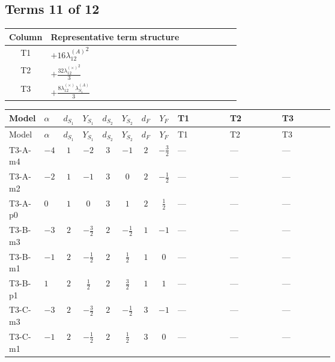 \documentclass[8pt]{article}
\begin{document}
\begin{landscape}
\subsection*{Terms 11 of 12}
\begin{center}
\begin{tabular}{@{}c >{\raggedright\arraybackslash}p{0.82\linewidth}@{}}
\toprule
Column & Representative term structure \\
\midrule
T1 & \(\displaystyle +16 {\lambda_{12}^{(A)}}^2\) \\
\midrule
T2 & \(\displaystyle +\frac{32 {\lambda_{12}^{(\times)}}^2}{3}\) \\
\midrule
T3 & \(\displaystyle +\frac{8 {\lambda_{12}^{(\times)}} {\lambda_{S_1}^{(A)}}}{3}\) \\
\midrule
\bottomrule
\end{tabular}
\end{center}
\smallskip
\tiny
\begin{longtable}{@{}llcccccc >{\raggedright\arraybackslash}p{0.21\linewidth} >{\raggedright\arraybackslash}p{0.21\linewidth} >{\raggedright\arraybackslash}p{0.21\linewidth}@{}}
\toprule
Model & $\alpha$ & $d_{S_1}$ & $Y_{S_1}$ & $d_{S_2}$ & $Y_{S_2}$ & $d_F$ & $Y_F$ & T1 & T2 & T3 \\
\midrule
\endfirsthead
\toprule
Model & $\alpha$ & $d_{S_1}$ & $Y_{S_1}$ & $d_{S_2}$ & $Y_{S_2}$ & $d_F$ & $Y_F$ & T1 & T2 & T3 \\
\midrule
\endhead
T3-A-m4 & $-4$ & $1$ & $-2$ & $3$ & $-1$ & $2$ & $-\frac{3}{2}$ & --- & --- & --- \\
\midrule
T3-A-m2 & $-2$ & $1$ & $-1$ & $3$ & $0$ & $2$ & $-\frac{1}{2}$ & --- & --- & --- \\
\midrule
T3-A-p0 & $0$ & $1$ & $0$ & $3$ & $1$ & $2$ & $\frac{1}{2}$ & --- & --- & --- \\
\midrule
T3-B-m3 & $-3$ & $2$ & $-\frac{3}{2}$ & $2$ & $-\frac{1}{2}$ & $1$ & $-1$ & --- & --- & --- \\
\midrule
T3-B-m1 & $-1$ & $2$ & $-\frac{1}{2}$ & $2$ & $\frac{1}{2}$ & $1$ & $0$ & --- & --- & --- \\
\midrule
T3-B-p1 & $1$ & $2$ & $\frac{1}{2}$ & $2$ & $\frac{3}{2}$ & $1$ & $1$ & --- & --- & --- \\
\midrule
T3-C-m3 & $-3$ & $2$ & $-\frac{3}{2}$ & $2$ & $-\frac{1}{2}$ & $3$ & $-1$ & --- & --- & --- \\
\midrule
T3-C-m1 & $-1$ & $2$ & $-\frac{1}{2}$ & $2$ & $\frac{1}{2}$ & $3$ & $0$ & --- & --- & --- \\

\end{longtable}
\end{landscape}
\end{document}
